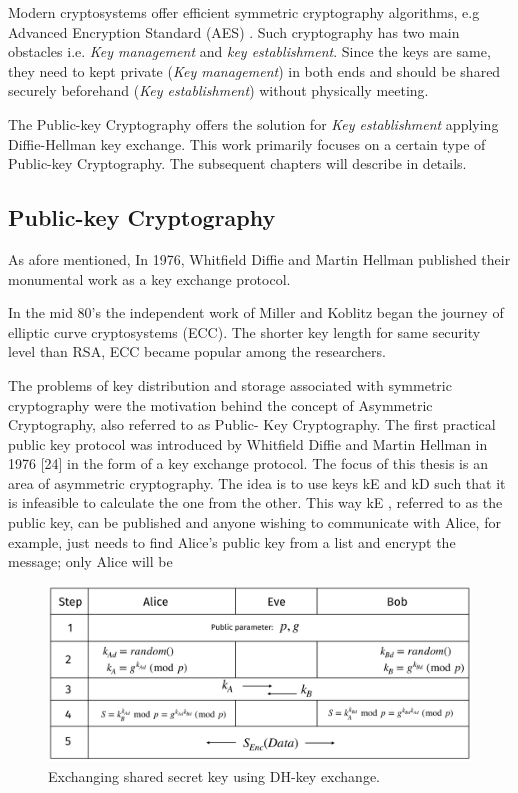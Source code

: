 Modern cryptosystems offer efficient symmetric cryptography algorithms, e.g Advanced Encryption Standard (AES) \cite{AES_DaemenR02}.
Such cryptography has two main obstacles i.e. \textit{Key management} and \textit{key establishment}.
Since the keys are same, they need to kept private (\textit{Key management})  in both ends and should be shared securely beforehand (\textit{Key establishment}) without physically meeting.

The Public-key Cryptography offers the solution for \textit{Key establishment} applying Diffie-Hellman key exchange.
This work primarily focuses on a certain type of Public-key Cryptography. 
The subsequent chapters will describe in details.

\subsection{Public-key Cryptography}
\label{ch1_subsec_pkc}
As afore mentioned, In 1976, Whitfield Diffie and Martin Hellman published their monumental work as a key exchange protocol. 

In the mid 80's the independent work of Miller \cite{C:Miller85} and Koblitz \cite{koblitz1987elliptic} began the journey of elliptic curve cryptosystems (ECC). 
The shorter key length for same security level than RSA, ECC became popular among the researchers. 

The problems of key distribution and storage associated with symmetric cryptography were the motivation behind the concept of Asymmetric Cryptography, also referred to as Public- Key Cryptography. The first practical public key protocol was introduced by Whitfield Diffie and Martin Hellman in 1976 [24] in the form of a key exchange protocol. The focus of this thesis is an area of asymmetric cryptography. The idea is to use keys kE and kD such that it is infeasible to calculate the one from the other. This way kE , referred to as the public key, can be published and anyone wishing to communicate with Alice, for example, just needs to find Alice’s public key from a list and encrypt the message; only Alice will be 

  \begin{figure}
    \centering
    \includegraphics[width=.9\linewidth, height=.67\textheight, keepaspectratio]{Figures/DHKE}
    \caption{Exchanging shared secret key using DH-key exchange.}
  \end{figure}

